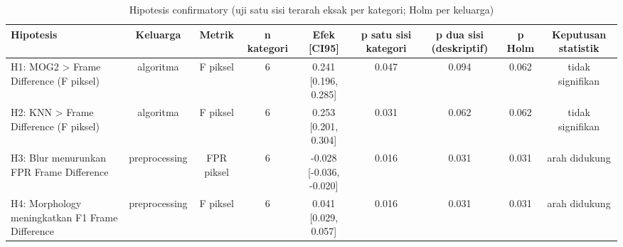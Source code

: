 \begin{table}[t]
\centering
\caption{Hipotesis confirmatory (uji satu sisi terarah eksak per kategori; Holm per keluarga)}
\label{tab:table_hypotheses}
\begin{tabular}{lcccccccc}
\toprule
Hipotesis & Keluarga & Metrik & n kategori & Efek [CI95] & p satu sisi kategori & p dua sisi (deskriptif) & p Holm & Keputusan statistik \\
\midrule
H1: MOG2 > Frame Difference (F piksel) & algoritma & F piksel & 6 & 0.241 [0.196, 0.285] & 0.047 & 0.094 & 0.062 & tidak signifikan \\
H2: KNN > Frame Difference (F piksel) & algoritma & F piksel & 6 & 0.253 [0.201, 0.304] & 0.031 & 0.062 & 0.062 & tidak signifikan \\
H3: Blur menurunkan FPR Frame Difference & preprocessing & FPR piksel & 6 & -0.028 [-0.036, -0.020] & 0.016 & 0.031 & 0.031 & arah didukung \\
H4: Morphology meningkatkan F1 Frame Difference & preprocessing & F piksel & 6 & 0.041 [0.029, 0.057] & 0.016 & 0.031 & 0.031 & arah didukung \\
\bottomrule
\end{tabular}
\end{table}
